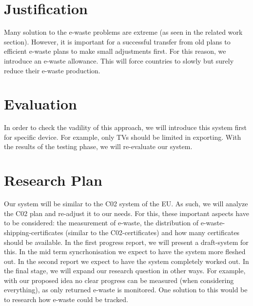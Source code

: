 \documentclass[sigchi-a, authorversion]{acmart}
\begin{document}
\section{Justification}

Many solution to the e-waste problems are extreme (as seen in the related work section). However, it is important
for a successful transfer from old plans to efficient e-waste plans to make small adjustments first. 
For this reason, we introduce an e-waste allowance. This will force countries to slowly but surely reduce their e-waste production.

\section{Evaluation}

In order to check the vadility of this approach, we will introduce this system first for specific device. 
For example, only TVs should be limited in exporting. With the results of the testing phase, we will 
re-evaluate our system.

\section{Research Plan}

Our system will be similar to the C02 system of the EU. As such, we will analyze the C02 plan and re-adjust 
it to our needs. For this, these important aspects have to be considered: the measurement of e-waste, 
the distribution of e-waste-shipping-certificates (similar to the C02-certificates) and how many certificates 
should be available. 
In the first progress report, we will present a draft-system for this. In the mid term syncrhonisation we expect
to have the system more fleshed out. In the second report we expect to have the system completely worked out.
In the final stage, we will expand our research question in other ways. For example, with our proposed idea no clear
progress can be measured (when considering everything), as only returned e-waste is monitored. One solution to this would
be to research how e-waste could be tracked. 



\end{document}
